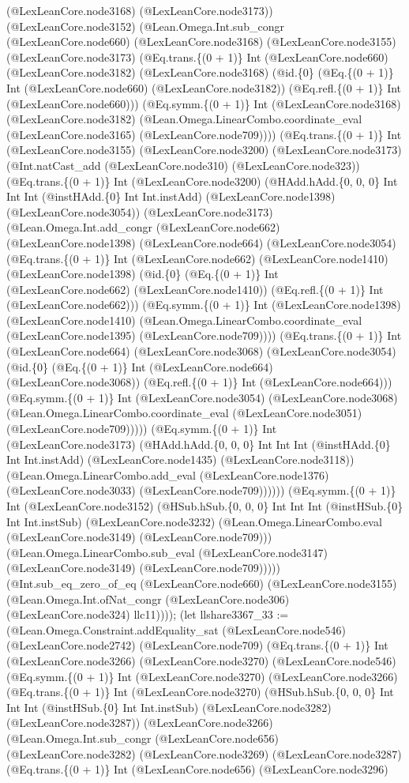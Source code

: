 \documentclass[11pt]{article}
\begin{document}
(@LexLeanCore.node3168) (@LexLeanCore.node3173)) (@LexLeanCore.node3152) (@Lean.Omega.Int.sub\_congr (@LexLeanCore.node660) (@LexLeanCore.node3168) (@LexLeanCore.node3155) (@LexLeanCore.node3173) (@Eq.trans.\{(0 + 1)\} Int (@LexLeanCore.node660) (@LexLeanCore.node3182) (@LexLeanCore.node3168) (@id.\{0\} (@Eq.\{(0 + 1)\} Int (@LexLeanCore.node660) (@LexLeanCore.node3182)) (@Eq.refl.\{(0 + 1)\} Int (@LexLeanCore.node660))) (@Eq.symm.\{(0 + 1)\} Int (@LexLeanCore.node3168) (@LexLeanCore.node3182) (@Lean.Omega.LinearCombo.coordinate\_eval (@LexLeanCore.node3165) (@LexLeanCore.node709)))) (@Eq.trans.\{(0 + 1)\} Int (@LexLeanCore.node3155) (@LexLeanCore.node3200) (@LexLeanCore.node3173) (@Int.natCast\_add (@LexLeanCore.node310) (@LexLeanCore.node323)) (@Eq.trans.\{(0 + 1)\} Int (@LexLeanCore.node3200) (@HAdd.hAdd.\{0, 0, 0\} Int Int Int (@instHAdd.\{0\} Int Int.instAdd) (@LexLeanCore.node1398) (@LexLeanCore.node3054)) (@LexLeanCore.node3173) (@Lean.Omega.Int.add\_congr (@LexLeanCore.node662) (@LexLeanCore.node1398) (@LexLeanCore.node664) (@LexLeanCore.node3054) (@Eq.trans.\{(0 + 1)\} Int (@LexLeanCore.node662) (@LexLeanCore.node1410) (@LexLeanCore.node1398) (@id.\{0\} (@Eq.\{(0 + 1)\} Int (@LexLeanCore.node662) (@LexLeanCore.node1410)) (@Eq.refl.\{(0 + 1)\} Int (@LexLeanCore.node662))) (@Eq.symm.\{(0 + 1)\} Int (@LexLeanCore.node1398) (@LexLeanCore.node1410) (@Lean.Omega.LinearCombo.coordinate\_eval (@LexLeanCore.node1395) (@LexLeanCore.node709)))) (@Eq.trans.\{(0 + 1)\} Int (@LexLeanCore.node664) (@LexLeanCore.node3068) (@LexLeanCore.node3054) (@id.\{0\} (@Eq.\{(0 + 1)\} Int (@LexLeanCore.node664) (@LexLeanCore.node3068)) (@Eq.refl.\{(0 + 1)\} Int (@LexLeanCore.node664))) (@Eq.symm.\{(0 + 1)\} Int (@LexLeanCore.node3054) (@LexLeanCore.node3068) (@Lean.Omega.LinearCombo.coordinate\_eval (@LexLeanCore.node3051) (@LexLeanCore.node709))))) (@Eq.symm.\{(0 + 1)\} Int (@LexLeanCore.node3173) (@HAdd.hAdd.\{0, 0, 0\} Int Int Int (@instHAdd.\{0\} Int Int.instAdd) (@LexLeanCore.node1435) (@LexLeanCore.node3118)) (@Lean.Omega.LinearCombo.add\_eval (@LexLeanCore.node1376) (@LexLeanCore.node3033) (@LexLeanCore.node709)))))) (@Eq.symm.\{(0 + 1)\} Int (@LexLeanCore.node3152) (@HSub.hSub.\{0, 0, 0\} Int Int Int (@instHSub.\{0\} Int Int.instSub) (@LexLeanCore.node3232) (@Lean.Omega.LinearCombo.eval (@LexLeanCore.node3149) (@LexLeanCore.node709))) (@Lean.Omega.LinearCombo.sub\_eval (@LexLeanCore.node3147) (@LexLeanCore.node3149) (@LexLeanCore.node709))))) (@Int.sub\_eq\_zero\_of\_eq (@LexLeanCore.node660) (@LexLeanCore.node3155) (@Lean.Omega.Int.ofNat\_congr (@LexLeanCore.node306) (@LexLeanCore.node324) llc11)))); (let llshare3367\_33 := (@Lean.Omega.Constraint.addEquality\_sat (@LexLeanCore.node546) (@LexLeanCore.node2742) (@LexLeanCore.node709) (@Eq.trans.\{(0 + 1)\} Int (@LexLeanCore.node3266) (@LexLeanCore.node3270) (@LexLeanCore.node546) (@Eq.symm.\{(0 + 1)\} Int (@LexLeanCore.node3270) (@LexLeanCore.node3266) (@Eq.trans.\{(0 + 1)\} Int (@LexLeanCore.node3270) (@HSub.hSub.\{0, 0, 0\} Int Int Int (@instHSub.\{0\} Int Int.instSub) (@LexLeanCore.node3282) (@LexLeanCore.node3287)) (@LexLeanCore.node3266) (@Lean.Omega.Int.sub\_congr (@LexLeanCore.node656) (@LexLeanCore.node3282) (@LexLeanCore.node3269) (@LexLeanCore.node3287) (@Eq.trans.\{(0 + 1)\} Int (@LexLeanCore.node656) (@LexLeanCore.node3296) 
\end{document}

